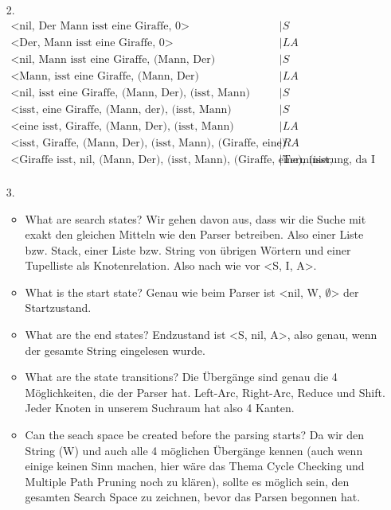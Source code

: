 \documentclass[ngerman]{fbi-aufgabenblatt}
\begin{document}
\begin{itemize}
\begin{itemize}
		\item[(d)] 
	\end{itemize}
	\item[2.]
	\begin{align}
		\text{<nil, Der Mann isst eine Giraffe, 0>} &| S\\
		\text{<Der, Mann isst eine Giraffe, 0>} &| LA\\
		\text{<nil, Mann isst eine Giraffe, {(Mann, Der)}} &| S\\
		\text{<Mann, isst eine Giraffe, {(Mann, Der)}} &| LA\\
		\text{<nil, isst eine Giraffe, {(Mann, Der), (isst, Mann)}} &| S\\
		\text{<isst, eine Giraffe, {(Mann, der), (isst, Mann)}} &| S\\
		\text{<eine isst, Giraffe, {(Mann, Der), (isst, Mann)}} &| LA\\
		\text{<isst, Giraffe, {(Mann, Der), (isst, Mann), (Giraffe, eine)}} &| RA\\
		\text{<Giraffe isst, nil, {(Mann, Der), (isst, Mann), (Giraffe, eine), (isst, Giraffe)}} &| \text{Terminierung, da I = nil}\\
	\end{align}
	\item[3.]
	\begin{itemize}
		\item What are search states? \newline Wir gehen davon aus, dass wir die Suche mit exakt den gleichen Mitteln wie den Parser betreiben. Also einer Liste bzw. Stack, einer Liste 				bzw. String von übrigen Wörtern und einer Tupelliste als Knotenrelation. Also nach wie vor <S, I, A>.
		\item What is the start state? \newline Genau wie beim Parser ist <nil, W, \(\emptyset\)> der Startzustand.
		\item What are the end states? \newline Endzustand ist <S, nil, A>, also genau, wenn der gesamte String eingelesen wurde.
		\item What are the state transitions? \newline Die Übergänge sind genau die 4 Möglichkeiten, die der Parser hat. Left-Arc, Right-Arc, Reduce und Shift. Jeder Knoten in unserem 				Suchraum hat also 4 Kanten.
		\item Can the seach space be created before the parsing starts? \newline Da wir den String (W) und auch alle 4 möglichen Übergänge kennen (auch wenn einige keinen Sinn machen, 		hier wäre das Thema Cycle Checking und Multiple Path Pruning noch zu klären), sollte es möglich sein, den gesamten Search Space zu zeichnen, bevor das Parsen begonnen hat.

\end{itemize}
\end{itemize}
\end{document}
